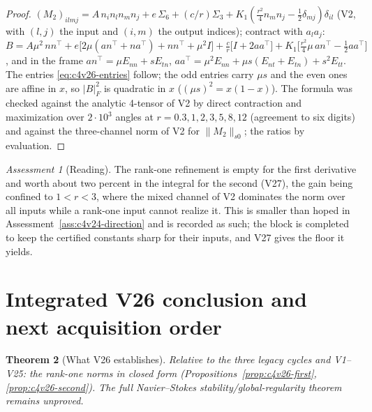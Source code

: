 \documentclass[11pt]{article}
\theoremstyle{plain}
\newtheorem{theorem}{Theorem}[section]
\theoremstyle{definition}
\theoremstyle{remark}
\newtheorem{assessment}[theorem]{Assessment}
\begin{document}
\begin{proof}
\((M_2)_{ilmj}=A\,n_in_ln_mn_j+e\,\Sigma_6+(c/r)\Sigma_3+K_1(\frac{r^2}4n_mn_j-\frac12\delta_{mj})\delta_{il}\) (V2, with
\((l,j)\) the input and \((i,m)\) the output indices); contract with \(a_la_j\):
\(B=A\mu^2\,nn^{\!\top}+e\bigl[2\mu(an^{\!\top}+na^{\!\top})+nn^{\!\top}+\mu^2I\bigr]+\frac cr\bigl[I+2aa^{\!\top}\bigr]+K_1\bigl[\frac{r^2}4\mu\,an^{\!\top}-\frac12aa^{\!\top}\bigr]\),
and in the frame \(an^{\!\top}=\mu E_{nn}+sE_{tn}\), \(aa^{\!\top}=\mu^2E_{nn}+\mu s(E_{nt}+E_{tn})+s^2E_{tt}\).  The
entries \eqref{eq:c4v26-entries} follow; the odd entries carry \(\mu s\) and the
even ones are affine in \(x\), so \(|B|_F^2\) is quadratic in \(x\) (\((\mu s)^2=x(1-x)\)).
The formula was checked against the analytic 4-tensor of V2 by
direct contraction and maximization over \(2\cdot10^3\) angles at
\(r=0.3,1,2,3,5,8,12\) (agreement to six digits) and against the
three-channel norm of V2 for \(\|M_2\|_{s0}\); the ratios by evaluation.
\end{proof}

\begin{assessment}[Reading]
\label{ass:c4v26-reading}
The rank-one refinement is empty for the first derivative and worth
about two percent in the integral for the second (V27), the gain
being confined to \(1<r<3\), where the mixed channel of V2 dominates the
norm over all inputs while a rank-one input cannot realize it.  This
is smaller than hoped in Assessment~\ref{ass:c4v24-direction} and is
recorded as such; the block is completed to keep the certified
constants sharp for their inputs, and V27 gives the floor it yields.
\end{assessment}

\section{Integrated V26 conclusion and next acquisition order}
\label{sec:c4v26-conclusion}

\begin{theorem}[What V26 establishes]
\label{thm:c4v26-conclusion}
Relative to the three legacy cycles and V1--V25: the rank-one norms
in closed form (Propositions~\ref{prop:c4v26-first}, \ref{prop:c4v26-second}).
The full Navier--Stokes stability/global-regularity theorem remains
unproved.
\end{theorem}
\end{document}
